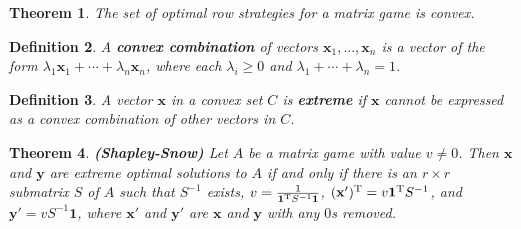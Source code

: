 \documentclass{article}
\theoremstyle{colontheorem}
\newtheorem{theorem}{Theorem}[section]
\newtheorem{definition}[theorem]{Definition}
\newcommand{\T}{^\textnormal{T}}
\newenvironment{Theorem}
{
	\begin{mdframed}[backgroundcolor=TheoremOrange!10]
	\begin{theorem}
}
{
	\end{theorem}
	\end{mdframed}
	
	\vspace{.15in}
}
\newenvironment{Def}
{
	\begin{mdframed}[backgroundcolor=DefGreen!10]
	\begin{definition}
}
{
	\end{definition}
	\end{mdframed}
	
	\vspace{.15in}
}
\begin{document}
\begin{Theorem}
	
	The set of optimal row strategies for a matrix game is convex.
	
\end{Theorem}



\begin{Def}
	
	A \textbf{convex combination} of vectors $\mathbf{x}_1, ..., \mathbf{x}_n$ is a vector of the form $\lambda_1 \mathbf{x}_1 + \cdots + \lambda_n \mathbf{x}_n$, where each $\lambda_i \geq 0$ and $\lambda_1 + \cdots  + \lambda_n = 1$.
	
\end{Def}



\begin{Def}
	
	A vector $\mathbf{x}$ in a convex set $C$ is \textbf{extreme} if $\mathbf{x}$ cannot be expressed as a convex combination of other vectors in $C$.
	
\end{Def}



\begin{Theorem}
	
	\textbf{(Shapley-Snow)} Let $A$ be a matrix game with value $v \neq 0$. Then $\mathbf{x}$ and $\mathbf{y}$ are extreme optimal solutions to $A$ if and only if there is an $r \times r$ submatrix $S$ of $A$ such that $S^{-1}$ exists, $v = \frac{1}{\mathbf{1}\T S^{-1} \mathbf{1}}$, $(\mathbf{x}')\T = v \mathbf{1}\T S^{-1}$, and $\mathbf{y}' = v S^{-1} \mathbf{1}$, where $\mathbf{x}'$ and $\mathbf{y}'$ are $\mathbf{x}$ and $\mathbf{y}$ with any $0$s removed.
	
\end{Theorem}
\end{document}
